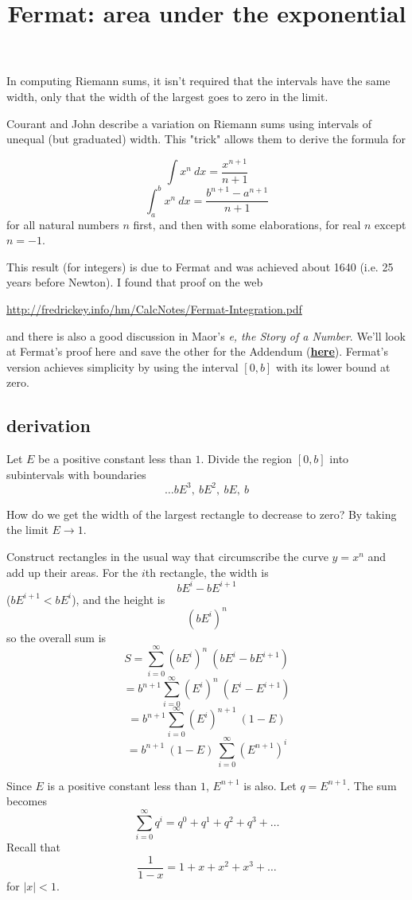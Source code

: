 \documentclass[11pt, oneside]{article}   	%
\title{Fermat:  area under the exponential}
\date{}
\begin{document}
\maketitle
\Large

In computing Riemann sums, it isn't required that the intervals have the same width, only that the width of the largest goes to zero in the limit.

Courant and John describe a variation on Riemann sums using intervals of unequal (but graduated) width.  This "trick" allows them to derive the formula for
 
\[ \int x^n \ dx = \frac{x^{n+1}}{n+1} \]
\[ \int_a^b x^n \ dx = \frac{b^{n+1} - a^{n+1}}{n+1} \]
for all natural numbers $n$ first, and then with some elaborations, for real $n$ except $n = -1$.

This result (for integers) is due to Fermat and was achieved about 1640 (i.e. 25 years before Newton).  I found that proof on the web

\url{http://fredrickey.info/hm/CalcNotes/Fermat-Integration.pdf}

and there is also a good discussion in Maor's \emph{e, the Story of a Number}.  We'll look at Fermat's proof here and save the other for the Addendum (\hyperref[sec:Courant_Riemann]{\textbf{here}}). Fermat's version achieves simplicity by using the interval $[0,b]$ with its lower bound at zero.

\subsection*{derivation}

Let $E$ be a positive constant less than $1$.  Divide the region $[0,b]$ into subintervals with boundaries 
\[ \dots bE^3, \ bE^2, \ bE, \ b \]

How do we get the width of the largest rectangle to decrease to zero?  By taking the limit $E \rightarrow 1$.

Construct rectangles in the usual way that circumscribe the curve $y = x^n$ and add up their areas.  For the $i$th rectangle, the width is
\[ bE^i - bE^{i+1} \]
($bE^{i+1} < bE^i$), and the height is
\[ (bE^i)^n \]
so the overall sum is
\[ S = \sum_{i = 0}^{\infty} (bE^i)^n \ (bE^i - bE^{i+1}) \]
\[ = b^{n+1} \sum_{i = 0}^{\infty} (E^i)^n \ (E^i - E^{i+1}) \]
\[ = b^{n+1} \sum_{i = 0}^{\infty} (E^i)^{n+1} \ (1 - E) \]
\[ = b^{n+1} \ (1 - E) \ \sum_{i = 0}^{\infty} (E^{n+1})^i \]

Since $E$ is a positive constant less than $1$, $E^{n+1}$ is also.  Let $q = E^{n+1}$.  The sum becomes
\[ \sum_{i = 0}^{\infty} q^i = q^0 + q^1 + q^2 + q^3 + \dots \]
Recall that
\[ \frac{1}{1-x} = 1 + x + x^2 + x^3 + \dots \]
for $|x| < 1$.  
\end{document}
